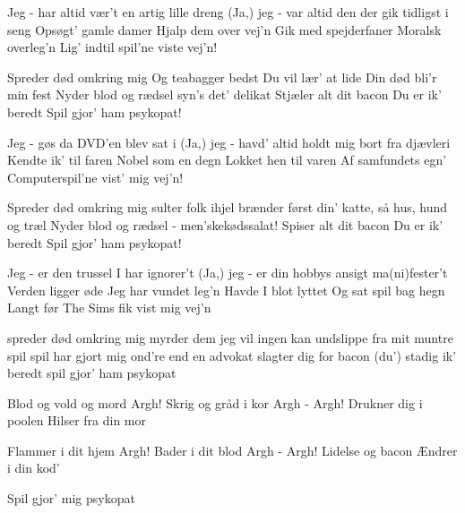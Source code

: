 \documentclass[a4paper,11pt]{article}
\begin{document}
\begin{song}

 Jeg - har altid vær't en artig lille dreng
(Ja,) jeg - var altid den der gik tidligst i seng
Opsøgt' gamle damer
Hjalp dem over vej'n
Gik med spejderfaner
Moralsk overleg'n
Lig' indtil spil'ne viste vej'n!

Spreder død omkring mig
Og teabagger bedst
Du vil lær' at lide
Din død bli'r min fest
Nyder blod og rædsel
syn's det' delikat
Stjæler alt dit bacon
Du er ik' beredt
 Spil gjor' ham psykopat!

Jeg - gøs da DVD'en blev sat i
(Ja,) jeg - havd' altid holdt mig bort fra djævleri
Kendte ik' til faren
Nobel som en degn
Lokket hen til varen
Af samfundets egn'
Computerspil'ne vist' mig vej'n!

Spreder død omkring mig
sulter folk ihjel
brænder først din' katte,
så hus, hund og træl
Nyder blod og rædsel
- men'skekødssalat!
Spiser alt dit bacon
Du er ik' beredt
 Spil gjor' ham psykopat!


Jeg - er den trussel I har ignorer't
(Ja,) jeg - er din hobbys ansigt ma(ni)fester't
Verden ligger øde
Jeg har vundet leg'n
Havde I blot lyttet
Og sat spil bag hegn
Langt før The Sims fik vist mig vej'n

spreder død omkring mig
myrder dem jeg vil
ingen kan undslippe
fra mit muntre spil
spil har gjort mig ond're
end en advokat
slagter dig for bacon
(du') stadig ik' beredt
 spil gjor' ham psykopat


 Blod og vold og mord
 Argh!
 Skrig og gråd i kor
 Argh - Argh!
 Drukner dig i poolen
 Hilser fra din mor

 Flammer i dit hjem
 Argh!
 Bader i dit blod
 Argh - Argh!
 Lidelse og bacon
 Ændrer i din kod'

 Spil gjor' mig psykopat

\end{song}
\end{document}
